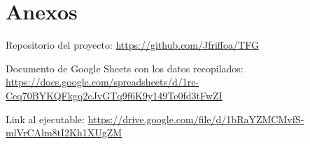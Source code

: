 \section{Anexos}\label{sec:anexos}

Repositorio del proyecto: \url{https://github.com/Jfriffoa/TFG}

Documento de Google Sheets con los datos recopilados: \url{https://docs.google.com/spreadsheets/d/1re-Ceq70BYKQFkgq2cJvGTq9f6K9y149Te0fd3tFwZI}

Link al ejecutable: \url{https://drive.google.com/file/d/1bRaYZMCMvfS-mlVrCAlm8tI2Kh1XUgZM}

\printglossary
\printglossary[type=\acronymtype]